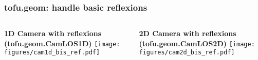 \documentclass[10pt]{beamer}
\begin{document}
\begin{frame}
\frametitle{tofu.geom: handle basic reflexions}
\begin{columns}
		\begin{column}{0.5\textwidth}
		\begin{center}
		\textbf{1D Camera with reflexions\\(tofu.geom.CamLOS1D)}
		\texttt{[image: figures/cam1d\_bis\_ref.pdf]}
	\end{center}
		\end{column}
		\begin{column}{0.5\textwidth}
		\begin{center}
		\textbf{2D Camera with reflexions\\(tofu.geom.CamLOS2D)}
		\texttt{[image: figures/cam2d\_bis\_ref.pdf]}
	\end{center}	
		\end{column}
	\end{columns}
\end{frame}

%	
\end{document}
